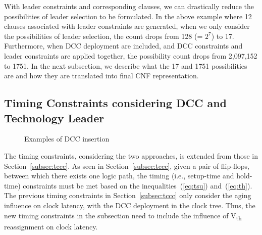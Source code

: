 With leader constraints and corresponding clauses, we can drastically reduce the possibilities of leader selection to be formulated. In the above example where 12 clauses associated with leader constraints are generated, when we only consider the possibilities of leader selection, the count drops from 128 (= $2^7$) to 17. Furthermore, when DCC deployment are included, and DCC constraints and leader constraints are applied together, the possibility count drops from 2,097,152 to 1751. In the next subsection, we describe what the 17 and 1751 possibilities are and how they are translated into final CNF representation.

\subsection{Timing Constraints considering DCC and Technology Leader}
\label{sec:TVA:timingconstraint}
\begin{figure*}
    \centering
    \hspace{1cm}
    \caption{Examples of DCC insertion}
    \label{fig:dccleaderinsert}
\end{figure*}
The timing constraints, considering the two approaches, is extended from those in Section~\ref{subsec:tccc}. As seen in Section~\ref{subsec:tccc}, given a pair of flip-flops, between which there exists one logic path, the timing (i.e., setup-time and hold-time) constraints must be met based on the inequalities~(\ref{eq:tsu}) and~(\ref{eq:th}). The previous timing constraints in Section~\ref{subsec:tccc} only consider the aging influence on clock latency, with the DCC deployment in the clock tree. Thus, the new timing constraints in the subsection need to include the influence of V\textsubscript{th} reassignment on clock latency. 

